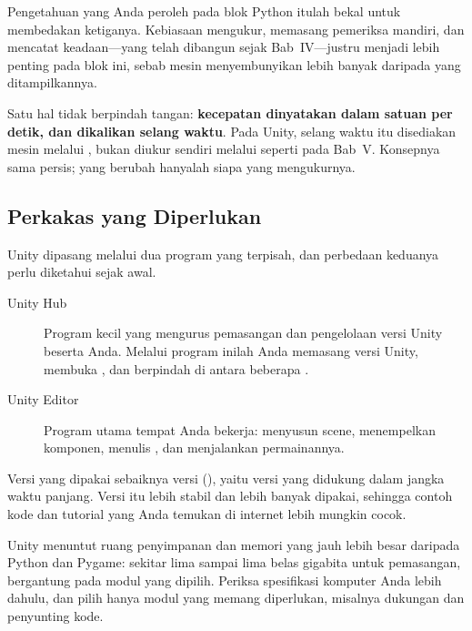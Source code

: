 Pengetahuan yang Anda peroleh pada blok Python itulah bekal untuk membedakan
ketiganya. Kebiasaan mengukur, memasang pemeriksa mandiri, dan mencatat
keadaan---yang telah dibangun sejak Bab~IV---justru menjadi lebih penting pada
blok ini, sebab mesin menyembunyikan lebih banyak daripada yang ditampilkannya.

\begin{catatabox}
Satu hal tidak berpindah tangan: \textbf{kecepatan dinyatakan
dalam satuan per detik, dan dikalikan selang waktu}. Pada Unity, selang waktu
itu disediakan mesin melalui , bukan diukur sendiri
melalui  seperti pada Bab~V. Konsepnya sama persis; yang
berubah hanyalah siapa yang mengukurnya.
\end{catatabox}

\subsection{Perkakas yang Diperlukan}

Unity dipasang melalui dua program yang terpisah, dan perbedaan keduanya perlu
diketahui sejak awal.

\begin{description}
  \item[Unity Hub] Program kecil yang mengurus pemasangan dan pengelolaan
        versi Unity beserta  Anda. Melalui program inilah Anda
        memasang versi Unity, membuka , dan berpindah di antara
        beberapa .
  \item[Unity Editor] Program utama tempat Anda bekerja: menyusun scene,
        menempelkan komponen, menulis , dan menjalankan
        permainannya.
\end{description}

Versi yang dipakai sebaiknya versi  (),
yaitu versi yang didukung dalam jangka waktu panjang. Versi itu lebih stabil
dan lebih banyak dipakai, sehingga contoh kode dan tutorial yang Anda temukan
di internet lebih mungkin cocok.

\begin{catatabox}
Unity menuntut ruang penyimpanan dan memori yang jauh lebih besar daripada
Python dan Pygame: sekitar lima sampai lima belas gigabita untuk pemasangan,
bergantung pada modul yang dipilih. Periksa spesifikasi komputer Anda lebih
dahulu, dan pilih hanya modul yang memang diperlukan, misalnya dukungan
 dan penyunting kode.
\end{catatabox}
